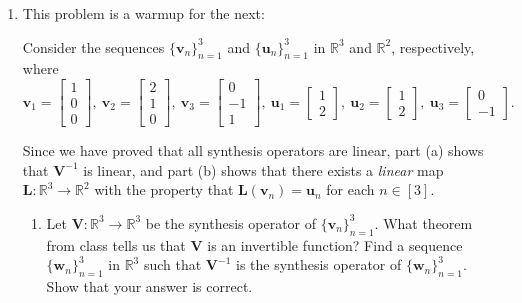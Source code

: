 \documentclass[12pt]{amsart}
\newcommand{\1}{\mathbbm{1}}
\numberwithin{equation}{section}
\numberwithin{Theorem}{section}
\theoremstyle{plain} %
\theoremstyle{definition}
\theoremstyle{remark}
\begin{document}
\thispagestyle{empty}

\bigskip





\begin{enumerate}[1.]

\item This problem is a warmup for the next:

Consider the sequences \(\{\mathbf{v}_{n}\}_{n=1}^{3}\) and \(\{\mathbf{u}_{n}\}_{n=1}^{3}\) in \(\mathbb{R}^{3}\) and \(\mathbb{R}^{2}\), respectively, where
\[\mathbf{v}_{1} = \begin{bmatrix} 1\\ 0\\ 0\end{bmatrix},\ \mathbf{v}_{2} = \begin{bmatrix} 2\\ 1\\ 0\end{bmatrix},\ \mathbf{v}_{3} = \begin{bmatrix} 0\\ -1\\ 1\end{bmatrix},\ \mathbf{u}_{1} = \begin{bmatrix} 1\\ 2\end{bmatrix},\ \mathbf{u}_{2} = \begin{bmatrix} 1\\ 2\end{bmatrix},\ \mathbf{u}_{3} = \begin{bmatrix} 0\\ -1\end{bmatrix}.\]

Since we have proved that all synthesis operators are linear, part (a) shows that \(\mathbf{V}^{-1}\) is linear, and part (b) shows that there exists a \textit{linear} map \(\mathbf{L}:\mathbb{R}^{3}\to\mathbb{R}^{2}\) with the property that \(\mathbf{L}(\mathbf{v}_{n}) = \mathbf{u}_{n}\) for each \(n\in[3]\).

\begin{enumerate}

\item Let \(\mathbf{V}:\mathbb{R}^{3}\to\mathbb{R}^{3}\) be the synthesis operator of \(\{\mathbf{v}_{n}\}_{n=1}^{3}\). What theorem from class tells us that \(\mathbf{V}\) is an invertible function? Find a sequence \(\{\mathbf{w}_{n}\}_{n=1}^{3}\) in \(\mathbb{R}^{3}\) such that \(\mathbf{V}^{-1}\) is the synthesis operator of \(\{\mathbf{w}_{n}\}_{n=1}^{3}\). Show that your answer is correct.



\end{enumerate}
\end{enumerate}
\end{document}
